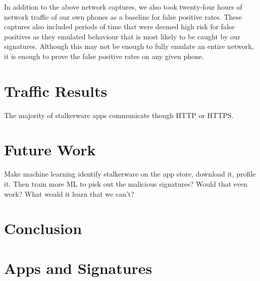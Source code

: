 \documentclass[acmtog]{acmart}
\begin{document}
In addition to the above network captures, we also took twenty-four hours of 
network traffic of our own phones as a baseline for false positive rates. These 
captures also included periods of time that were deemed high risk for false 
positives as they emulated behaviour that is most likely to be caught by our 
signatures. Although this may not be enough to fully emulate an entire network, 
it is enough to prove the false positive rates on any given phone.

\section{Traffic Results}

The majority of stalkerware apps communicate though HTTP or HTTPS.

\section{Future Work}

Make machine learning identify stalkerware on the app store, download it, 
profile it. Then train more ML to pick out the malicious signatures? Would that 
even work? What would it learn that we can't?

\section{Conclusion}




\appendix

\section{Apps and Signatures}
\end{document}
